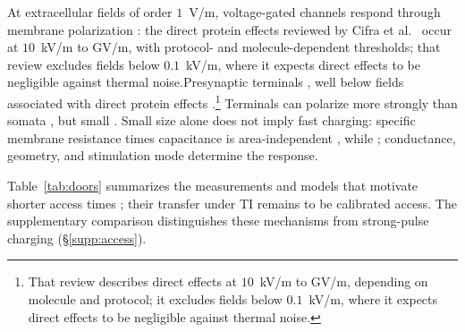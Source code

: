 \documentclass[11pt,a4paper]{article}
\newif\ifjne
\providecommand{\DIFaddtex}[1]{{\protect\color{blue} \sf #1}} %
\providecommand{\DIFdeltex}[1]{{\protect\color{red} \scriptsize #1}} %
\providecommand{\DIFaddbegin}{} %
\providecommand{\DIFaddend}{} %
\providecommand{\DIFdelbegin}{} %
\providecommand{\DIFdelend}{} %
\providecommand{\DIFadd}[1]{\texorpdfstring{\DIFaddtex{#1}}{#1}} %
\providecommand{\DIFdel}[1]{\texorpdfstring{\DIFdeltex{#1}}{}} %
\begin{document}
At \DIFdelbegin \DIFdel{extracellular }\DIFdelend fields of order $1$~V/m, \DIFdelbegin \DIFdel{voltage-gated }\DIFdelend channels respond through membrane polarization\DIFdelbegin \DIFdel{: the direct protein effects reviewed by Cifra et al.\
\cite{cifra2026} occur at $10$~kV/m to GV/m,
with protocol- and molecule-dependent
thresholds; that review excludes fields below $0.1$~kV/m, where it expects direct effects to be negligible against thermal noise.Presynaptic terminals }\DIFdelend \DIFaddbegin \DIFadd{,
well below fields associated with direct protein effects
\cite{cifra2026}.}\footnote{\DIFadd{That review describes direct effects at $10$~kV/m
to GV/m, depending on molecule and protocol; it excludes fields below
$0.1$~kV/m, where it expects direct effects to be negligible against thermal noise.}}
\DIFadd{Terminals }\DIFaddend can polarize more strongly than somata
\cite{rahman2013,aberra2023,chakraborty2018}\DIFdelbegin \DIFdel{, but small
}\DIFdelend \DIFaddbegin \DIFadd{. Small }\DIFaddend size alone does not imply
fast charging: specific membrane resistance times capacitance is area-independent\DIFdelbegin \DIFdel{, while }\DIFdelend \DIFaddbegin \DIFadd{;
}\DIFaddend conductance, geometry, and stimulation mode determine \DIFdelbegin \DIFdel{the response. }%

\DIFdel{Table~\ref{tab:doors} summarizes the measurements and models that motivate shorter
access times ; their transfer under TI remains to be calibrated}\DIFdelend \DIFaddbegin \DIFadd{access. The supplementary
comparison distinguishes these mechanisms from strong-pulse charging
(\S\ref{supp:access}).
}\ifjne\else
\end{document}
